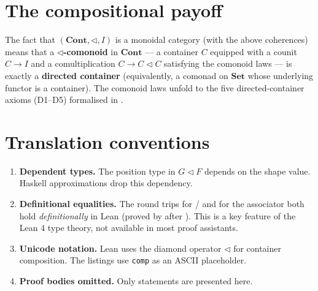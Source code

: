 \documentclass[11pt,a4paper]{article}
\begin{document}
\section{The compositional payoff}

The fact that $({\mathbf{Cont}}, \triangleleft, I)$ is a monoidal category
(with the above coherences) means that a \textbf{$\triangleleft$-comonoid} in
$\mathbf{Cont}$ --- a container $C$ equipped with a counit $C \to I$ and a
comultiplication $C \to C \triangleleft C$ satisfying the comonoid laws ---
is exactly a \textbf{directed container} (equivalently, a comonad on
$\mathbf{Set}$ whose underlying functor is a container).  The comonoid laws
unfold to the five directed-container axioms (D1--D5) formalised in
.

\section{Translation conventions}

\begin{enumerate}
\item \textbf{Dependent types.}  The position type in $G \triangleleft F$
  depends on the shape value.  Haskell approximations drop this dependency.

\item \textbf{Definitional equalities.}  The round trips for  /
   and for the associator both hold \emph{definitionally}
  in Lean (proved by  after ).  This is a key feature
  of the Lean 4 type theory, not available in most proof assistants.

\item \textbf{Unicode notation.}  Lean uses the diamond operator
  $\triangleleft$ for container composition.  The listings use
  \texttt{comp} as an ASCII placeholder.

\item \textbf{Proof bodies omitted.}  Only statements are presented here.
\end{enumerate}
\end{document}
